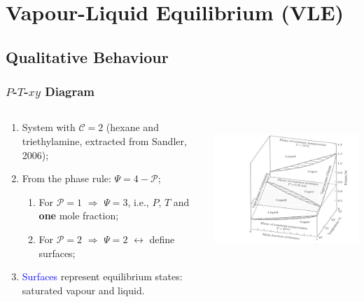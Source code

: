 \documentclass[10pt,compress,handout,ignorenonframetext,unknownkeysallowed]{beamer}
\begin{document}
\section{Vapour-Liquid Equilibrium (VLE)}

\subsection{Qualitative Behaviour}
\begin{frame}
  \frametitle{$P$-$T$-$xy$ Diagram}
  \begin{columns}
     \begin{column}[l]{0.3\linewidth}
        \begin{enumerate}
            \item<1-> System with $\mathcal{C} =2$ (hexane and triethylamine, extracted from Sandler, 2006);
            \item<2-> From the phase rule: $\Psi = 4 -\mathcal{P}$;
                \begin{enumerate}
                    \item<3-> For $\mathcal{P}=1$ $\Longrightarrow$ $\Psi=3$, i.e., $P$, $T$ and {\bf one} mole fraction;
                    \item<4-> For $\mathcal{P}=2$ $\Longrightarrow$ $\Psi=2$ $\leftrightarrow$ define surfaces;
                \end{enumerate}
            \item<5-> \textcolor{blue}{Surfaces} represent equilibrium states: saturated vapour and liquid.
        \end{enumerate}
     \end{column}
     \begin{column}[l]{0.7\linewidth}
        \hbox{\hspace{-1cm}
           \includegraphics[width=9.7cm,clip]{./../Pics/PTxy_diagram}}
     \end{column}
  \end{columns}
\end{frame}
\normalsize
\end{document}
